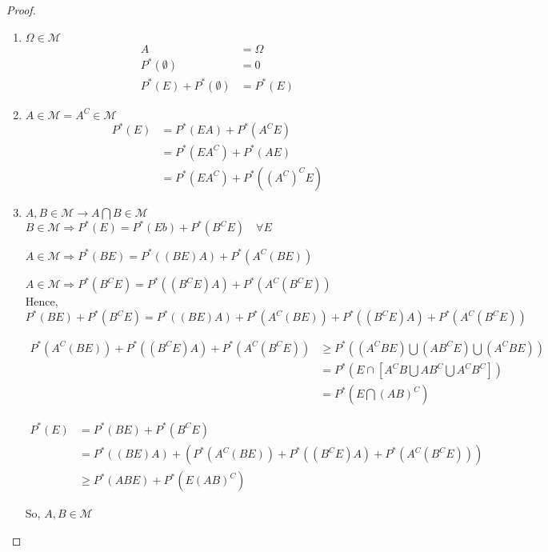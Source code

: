\documentclass[11pt,fleqn]{book} %
\begin{document}
\begin{proof}


\begin{enumerate}[label = (\roman*)]
	\item $\Omega \in \mathcal{M}$\\

	$$\begin{aligned}
			A &= \Omega\\
			P^*(\emptyset) &= 0\\
			P^*(E) + P^*(\emptyset) &= P^*(E)
		\end{aligned}$$

	\item $A \in \mathcal{M} = A^C \in \mathcal{M}$\\

	$$\begin{aligned}
		P^*(E) &= P^*(EA) + P^*(A^C E)\\
		&= P^*(EA^C) + P^*(A E)\\
		&= P^*(EA^C) + P^*((A^C)^C E)
	\end{aligned}$$

	\item $A, B \in \mathcal{M} \rightarrow A \bigcap B \in \mathcal{M}$\\

	$B \in \mathcal{M} \Rightarrow P^*(E) = P^*(Eb) + P^*(B^C E) \quad \forall E$

	$A \in \mathcal{M} \Rightarrow P^*(BE) = P^*((BE)A) + P^*(A^C (BE))$

	$A \in \mathcal{M} \Rightarrow P^*(B^CE) = P^*((B^CE)A) + P^*(A^C (B^CE))$\\

	Hence, \\
	
	$$P^*(BE) + P^*(B^CE) = P^*((BE)A) + P^*(A^C (BE)) + P^*((B^CE)A) + P^*(A^C (B^CE))$$

	$$\begin{aligned}
		P^*(A^C (BE)) + P^*((B^CE)A) + P^*(A^C (B^CE)) &\geq P^*((A^C BE) \bigcup (AB^CE)\bigcup(A^CBE))\\
			&= P^*(E\cap[A^CB\bigcup  AB^C\bigcup A^CB^C])\\
			&= P^*(E \bigcap (AB)^C)
	\end{aligned} $$

	$$\begin{aligned}
		P^*(E) &= P^*(BE) + P^*(B^CE)\\
		&= P^*((BE)A) + (P^*(A^C (BE)) + P^*((B^CE)A) + P^*(A^C (B^CE)))\\
		&\geq P^*(ABE) + P^*(E(AB)^C)
	\end{aligned} $$
	
	 

	So, $A,B \in \mathcal{M}$
\end{enumerate}
\end{proof}
\end{document}
